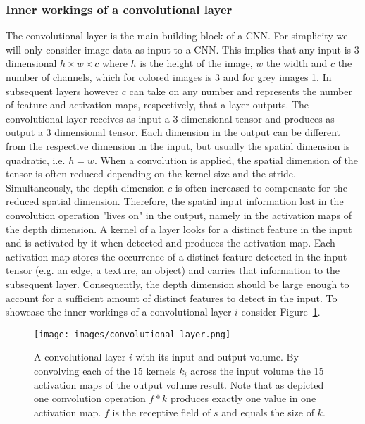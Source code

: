 \documentclass[12pt,a4paper]{article}
\begin{document}
\subsubsection{Inner workings of a convolutional layer}\label{subsec:innerworkconvl}
The convolutional layer is the main building block of a CNN. For simplicity we will only consider image data as input to a CNN. This implies that any input is 3 dimensional $h \times w \times c$ where $h$ is the height of the image, $w$ the width and $c$ the number of channels, which for colored images is 3 and for grey images 1.  In subsequent layers however $c$ can take on any number and represents the number of feature and activation maps, respectively, that a layer outputs. The convolutional layer receives as input a 3 dimensional tensor and produces as output a 3 dimensional tensor. Each dimension in the output can be different from the respective dimension in the input, but usually the spatial dimension is quadratic, i.e. $h = w$. When a convolution is applied, the spatial dimension of the tensor is often reduced depending on the kernel size and the stride. Simultaneously, the depth dimension $c$ is often increased to compensate for the reduced spatial dimension. Therefore, the spatial input information lost in the convolution operation "lives on" in the output, namely in the activation maps of the depth dimension. A kernel of a layer looks for a distinct feature in the input and is activated by it when detected and produces the activation map. Each activation map stores the occurrence of a distinct feature detected in the input tensor (e.g. an edge, a texture, an object) and carries that information to the subsequent layer. Consequently, the depth dimension should be large enough to account for a sufficient amount of distinct features to detect in the input. To showcase the inner workings of a convolutional layer $i$ consider Figure~\ref{fig:conv_layer}. 
\begin{figure}[ht]
\centering
\texttt{[image: images/convolutional\_layer.png]}
\caption{A convolutional layer $i$ with its input and output volume. By convolving each of the 15 kernels $k_i$ across the input volume the 15 activation maps of the output volume result. Note that as depicted one convolution operation $f * k$ produces exactly one value in one activation map. $f$ is the receptive field of $s$ and equals the size of $k$.}
\label{fig:conv_layer}
\end{figure}
\end{document}
